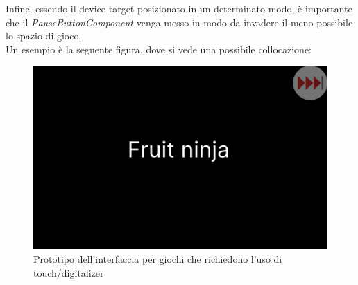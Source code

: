 Infine, essendo il device target posizionato in un determinato modo, è importante che il \emph{PauseButtonComponent} venga messo in modo da invadere il meno possibile lo spazio di gioco.\\
Un esempio è la seguente figura, dove si vede una possibile collocazione:
\begin{figure}[h]
    \centering
    \includegraphics[width=340pt]{images/prog/TouchDigitMockup.png}
    \caption{Prototipo dell'interfaccia per giochi che richiedono l'uso di touch/digitalizer}
    \label{fig:touchDigit}
\end{figure}
\newpage
